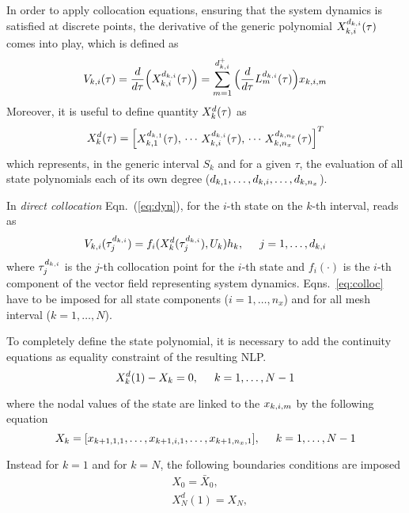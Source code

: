In order to apply collocation equations, ensuring that the system dynamics is satisfied at discrete points, the derivative of the generic polynomial $X_{k,i}^{d_{k,i}} (\tau)$ comes into play, which is defined as
\begin{equation}
V_{k,i} (\tau) = \frac{d}{d\tau}\Big(X_{k,i}^{d_{k,i}}(\tau)\Big) = \sum_{m=1}^{d_{k,i}^{+}}\Big(\frac{d}{d\tau}L_{m}^{d_{k,i}}(\tau)\Big)x_{k,i,m}
\end{equation}
Moreover, it is useful to define quantity $X_{k}^{d} (\tau)$ as
\begin{equation}
X_{k}^{d}(\tau) =
\begin{bmatrix}
X_{k,1}^{d_{k,1}}(\tau),\, \cdots \, X_{k,i}^{d_{k,i}}(\tau), \, \cdots\, 
X_{k,n_x}^{d_{k,n_x}}(\tau)
\end{bmatrix}^T
\end{equation}
which represents, in the generic interval $S_k$ and for a given $\tau$, the evaluation of all state polynomials each of its own degree ($d_{k,1}, \dots, d_{k,i}, \dots, d_{k,n_{x}}$).

In \emph{direct collocation} Eqn.~(\ref{eq:dyn}), for the $i$-th state on the $k$-th interval, reads as
\begin{equation}\label{eq:colloc}
V_{k,i}(\tau_{j}^{d_{k,i}}) = f_i(X_{k}^{d}(\tau_{j}^{d_{k,i}}),  U_k) h_{k}, \hspace{5mm} j = 1, \dots, d_{k,i}
\end{equation}
where $\tau_{j}^{d_{k,i}}$ is the $j$-th collocation point for the $i$-th state and $f_i(\cdot)$ is the $i$-th component of the vector field representing system dynamics. Eqns.~\eqref{eq:colloc} have to be imposed for all state components ($i = 1, \dots, n_x$) and for all mesh interval ($k = 1, \dots, N$).

To completely define the state polynomial, it is necessary to add the continuity equations  as equality constraint of the resulting NLP.    
\begin{equation}\label{eq:continuity}
X_{k}^{d}(1) - X_k = 0, \hspace{5mm} k = 1, \dots, N-1
\end{equation}

where the nodal values of the state are linked to the $x_{k,i,m}$ by the following equation
\begin{equation}
X_k = [x_{k+1,1,1}, \dots, x_{k+1,i,1}, \dots, x_{k+1,n_{x},1}], \hspace{5mm} k = 1, \dots, N-1
\end{equation}

Instead for $k = 1$ and for $k = N$, the following boundaries conditions are imposed
\begin{subequations}
	\begin{align}
	& X_{0} = \bar{X}_{0} \label{eq:intial},\\
	& X_{N}^{d}(1) = X_N \label{eq:final},
	\end{align}
\end{subequations} 

